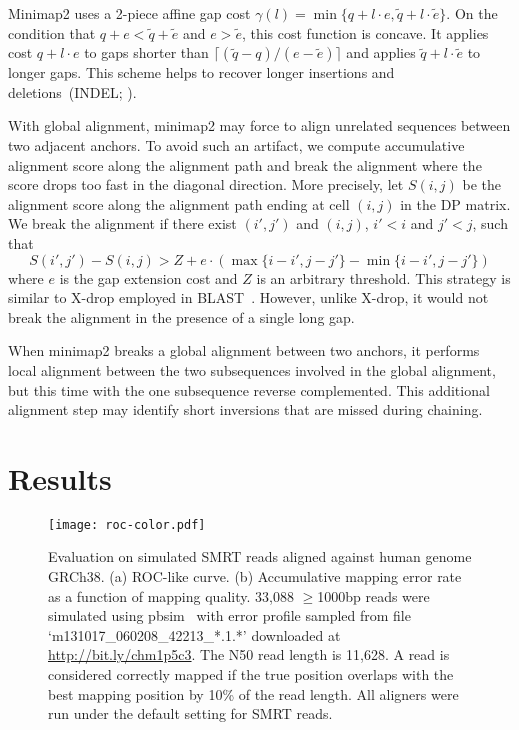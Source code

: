 \documentclass{bioinfo}
\begin{document}
\begin{methods}
Minimap2 uses a 2-piece affine gap cost
$\gamma(l)=\min\{q+l\cdot e,\tilde{q}+l\cdot\tilde{e}\}$.
On the condition that $q+e<\tilde{q}+\tilde{e}$ and $e>\tilde{e}$, this
cost function is concave. It applies cost $q+l\cdot e$ to gaps shorter than
$\lceil(\tilde{q}-q)/(e-\tilde{e})\rceil$ and applies
$\tilde{q}+l\cdot\tilde{e}$ to longer gaps. This scheme helps to recover
longer insertions and deletions~(INDEL; \citealp{Gotoh:1990aa}).

With global alignment, minimap2 may force to align unrelated sequences between
two adjacent anchors. To avoid such an artifact, we compute accumulative
alignment score along the alignment path and break the alignment where the
score drops too fast in the diagonal direction. More precisely, let $S(i,j)$ be
the alignment score along the alignment path ending at cell $(i,j)$ in the DP
matrix. We break the alignment if there exist $(i',j')$ and $(i,j)$, $i'<i$ and
$j'<j$, such that
\[
S(i',j')-S(i,j)>Z+e\cdot(\max\{i-i',j-j'\}-\min\{i-i',j-j'\})
\]
where $e$ is the gap extension cost and $Z$ is an arbitrary threshold.
This strategy is similar to X-drop employed in BLAST~\citep{Altschul:1997vn}.
However, unlike X-drop, it would not break the alignment in the presence of a
single long gap.

When minimap2 breaks a global alignment between two anchors, it performs local
alignment between the two subsequences involved in the global alignment, but
this time with the one subsequence reverse complemented. This additional
alignment step may identify short inversions that are missed during chaining.

\end{methods}

\section{Results}
\begin{figure}[!tb]
\centering
\texttt{[image: roc-color.pdf]}
\caption{Evaluation on simulated SMRT reads aligned against human genome
GRCh38. (a) ROC-like curve. (b) Accumulative mapping error rate as a function
of mapping quality. 33,088 $\ge$1000bp reads were simulated using
pbsim~\citep{Ono:2013aa} with error profile sampled from file
`m131017\_060208\_42213\_*.1.*' downloaded at
\href{http://bit.ly/chm1p5c3}{http://bit.ly/chm1p5c3}. The N50 read length is
11,628. A read is considered correctly mapped if the true position overlaps
with the best mapping position by 10\% of the read length. All aligners were
run under the default setting for SMRT reads.}\label{fig:eval}
\end{figure}
\end{document}
